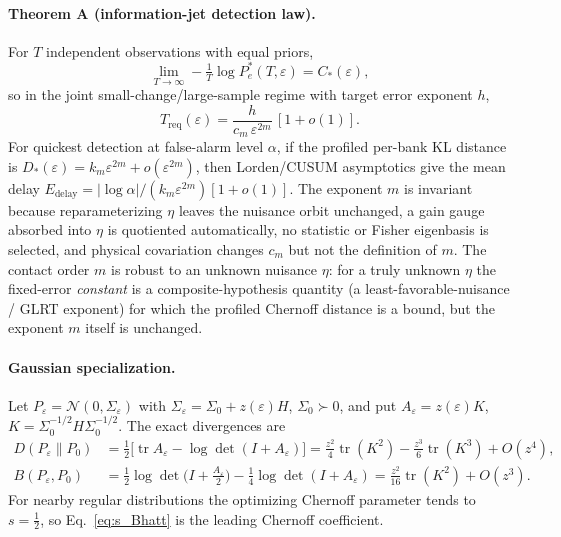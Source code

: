 \documentclass[aps,prl,onecolumn,notitlepage,nofootinbib,superscriptaddress]{revtex4-2}
\newcommand{\Treq}{T_{\mathrm{req}}}
\newcommand{\Cstar}{C_{\ast}}
\newcommand{\tr}{\operatorname{tr}}
\newcommand{\eps}{\varepsilon}
\begin{document}
\paragraph*{Theorem A (information-jet detection law).}
For $T$ independent observations with equal priors,
\begin{equation}
\lim_{T\to\infty}-\tfrac{1}{T}\log P_e^{\ast}(T,\eps)=\Cstar(\eps),
\end{equation}
so in the joint small-change/large-sample regime with target error exponent $h$,
\begin{equation}
\Treq(\eps)=\frac{h}{c_m\,\eps^{2m}}\,[1+o(1)] .
\label{eq:s_Treq}
\end{equation}
For quickest detection at false-alarm level $\alpha$, if the profiled per-bank KL
distance is $D_{\ast}(\eps)=k_m\eps^{2m}+o(\eps^{2m})$, then Lorden/CUSUM
asymptotics give the mean delay $E_{\mathrm{delay}}=|\log\alpha|/(k_m\eps^{2m})
[1+o(1)]$. The exponent $m$ is invariant because reparameterizing $\eta$ leaves
the nuisance orbit unchanged, a gain gauge absorbed into $\eta$ is quotiented
automatically, no statistic or Fisher eigenbasis is selected, and physical
covariation changes $c_m$ but not the definition of $m$. The contact order $m$ is
robust to an unknown nuisance $\eta$: for a truly unknown $\eta$ the fixed-error
\emph{constant} is a composite-hypothesis quantity (a least-favorable-nuisance /
GLRT exponent) for which the profiled Chernoff distance is a bound, but the
exponent $m$ itself is unchanged.

\paragraph*{Gaussian specialization.}
Let $P_\eps=\mathcal{N}(0,\Sigma_\eps)$ with
$\Sigma_\eps=\Sigma_0+z(\eps)H$, $\Sigma_0\succ0$, and put
$A_\eps=z(\eps)K$, $K=\Sigma_0^{-1/2}H\Sigma_0^{-1/2}$. The exact divergences are
\begin{align}
D(P_\eps\|P_0)&=\tfrac12\big[\tr A_\eps-\log\det(I+A_\eps)\big]
   = \frac{z^2}{4}\tr(K^2)-\frac{z^3}{6}\tr(K^3)+O(z^4),
\label{eq:s_KL}\\
B(P_\eps,P_0)&=\tfrac12\log\det\!\Big(I+\tfrac{A_\eps}{2}\Big)
   -\tfrac14\log\det(I+A_\eps)
   = \frac{z^2}{16}\tr(K^2)+O(z^3).
\label{eq:s_Bhatt}
\end{align}
For nearby regular distributions the optimizing Chernoff parameter tends to
$s=\tfrac12$, so Eq.~\eqref{eq:s_Bhatt} is the leading Chernoff coefficient.
\end{document}

